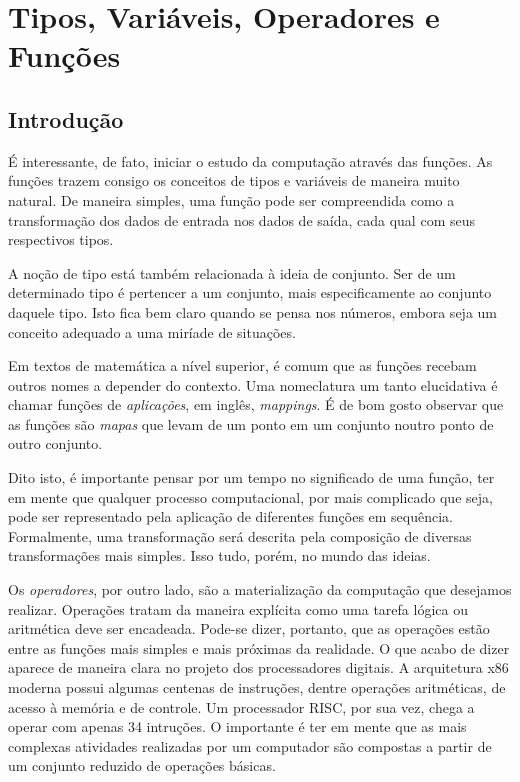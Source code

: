 \chapter{Tipos, Variáveis, Operadores e Funções}%

	\section*{Introdução}%
	É interessante, de fato, iniciar o estudo da computação através das funções. As funções trazem consigo os conceitos de tipos e variáveis de maneira muito natural. De maneira simples, uma função pode ser compreendida como a transformação dos dados de entrada nos dados de saída, cada qual com seus respectivos tipos. \par
	
	A noção de tipo está também relacionada à ideia de conjunto. Ser de um determinado tipo é pertencer a um conjunto, mais especificamente ao conjunto daquele tipo. Isto fica bem claro quando se pensa nos números, embora seja um conceito adequado a uma miríade de situações. \par
	
	Em textos de matemática a nível superior, é comum que as funções recebam outros nomes a depender do contexto. Uma nomeclatura um tanto elucidativa é chamar funções de \textit{aplicações}, em inglês, \textit{mappings}. É de bom gosto observar que as funções são \textit{mapas} que levam de um ponto em um conjunto noutro ponto de outro conjunto. \par

	Dito isto, é importante pensar por um tempo no significado de uma função, ter em mente que qualquer processo computacional, por mais complicado que seja, pode ser representado pela aplicação de diferentes funções em sequência. Formalmente, uma transformação será descrita pela composição de diversas transformações mais simples. Isso tudo, porém, no mundo das ideias. \par

	Os \textit{operadores}, por outro lado, são a materialização da computação que desejamos realizar. Operações tratam da maneira explícita como uma tarefa lógica ou aritmética deve ser encadeada. Pode-se dizer, portanto, que as operações estão entre as funções mais simples e mais próximas da realidade. O que acabo de dizer aparece de maneira clara no projeto dos processadores digitais. A arquitetura x86 moderna possui algumas centenas de instruções, dentre operações aritméticas, de acesso à memória e de controle. Um processador RISC, por sua vez, chega a operar com apenas 34 intruções\cite{arm:1995}. O importante é ter em mente que as mais complexas atividades realizadas por um computador são compostas a partir de um conjunto reduzido de operações básicas. \par

